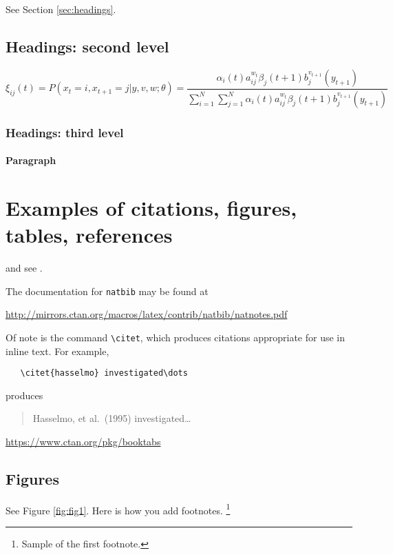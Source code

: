 \documentclass{article}
\begin{document}
\lipsum[4] See Section \ref{sec:headings}.

\subsection{Headings: second level}
\lipsum[5]
\begin{equation}
\xi _{ij}(t)=P(x_{t}=i,x_{t+1}=j|y,v,w;\theta)= {\frac {\alpha _{i}(t)a^{w_t}_{ij}\beta _{j}(t+1)b^{v_{t+1}}_{j}(y_{t+1})}{\sum _{i=1}^{N} \sum _{j=1}^{N} \alpha _{i}(t)a^{w_t}_{ij}\beta _{j}(t+1)b^{v_{t+1}}_{j}(y_{t+1})}}
\end{equation}

\subsubsection{Headings: third level}
\lipsum[6]

\paragraph{Paragraph}
\lipsum[7]

\section{Examples of citations, figures, tables, references}
\label{sec:others}
\lipsum[8] \cite{kour2014real,kour2014fast} and see \cite{hadash2018estimate}.

The documentation for \verb+natbib+ may be found at
\begin{center}
  \url{http://mirrors.ctan.org/macros/latex/contrib/natbib/natnotes.pdf}
\end{center}
Of note is the command \verb+\citet+, which produces citations
appropriate for use in inline text.  For example,
\begin{verbatim}
   \citet{hasselmo} investigated\dots
\end{verbatim}
produces
\begin{quote}
  Hasselmo, et al.\ (1995) investigated\dots
\end{quote}

\begin{center}
  \url{https://www.ctan.org/pkg/booktabs}
\end{center}


\subsection{Figures}
\lipsum[10] 
See Figure \ref{fig:fig1}. Here is how you add footnotes. \footnote{Sample of the first footnote.}
\lipsum[11] 
\end{document}
